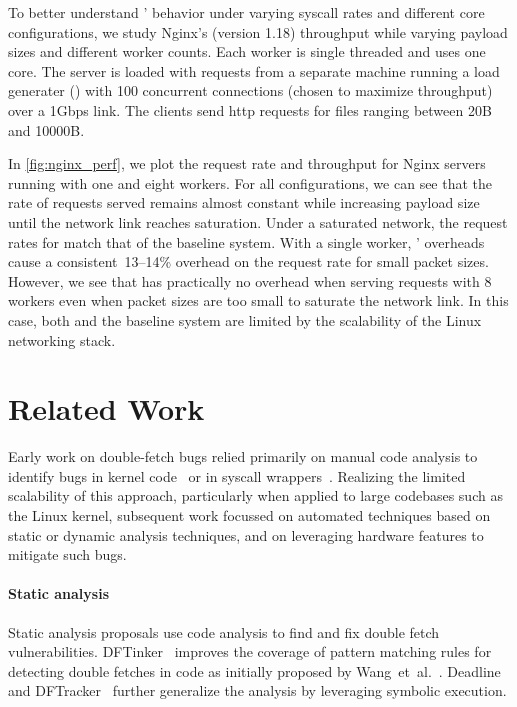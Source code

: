 To better understand \midas' behavior under varying syscall
rates and different core configurations, we study Nginx's (version 1.18)
throughput while varying payload sizes and different worker counts.
Each worker is single threaded and uses one core.
The server is loaded with requests from a separate machine running
a load generater () with 100 concurrent
connections (chosen to maximize throughput) over a 1Gbps link.
The clients send http requests for files ranging between 20B and
10000B.

In \autoref{fig:nginx_perf}, we plot the request rate and throughput
for Nginx servers running with one and eight workers.
For all configurations, we can see that the rate of requests served
remains almost constant while increasing payload size until the network
link reaches saturation.
Under a saturated network, the request rates for \midas match that
of the baseline system.
With a single worker, \midas' overheads cause a consistent~13--14\%
overhead on the request rate for small packet sizes.
However, we see that \midas has practically no overhead when serving
requests with 8 workers even when packet sizes are too small to
saturate the network link.
In this case, both \midas and the baseline system are limited by the
scalability of the Linux networking stack.

\section{Related Work}

Early work on double-fetch bugs relied primarily on manual
code analysis to identify bugs in kernel code~\cite{YangCSS12, twizsgrakky07ring0}
or in syscall wrappers~\cite{watson2007exploiting}.
Realizing the limited scalability of this approach, particularly
when applied to large codebases such as the Linux kernel, subsequent 
work focussed on automated techniques based on static or dynamic 
analysis techniques, and on leveraging hardware features to mitigate
such bugs.


\paragraph{Static analysis}
%
Static analysis proposals use code analysis to find and fix double fetch
vulnerabilities.
DFTinker~\cite{dftinker} improves the coverage of pattern matching rules
for detecting double fetches in code as initially proposed by Wang~et~al.~\cite{wang2017double}.
Deadline~\cite{deadline} and DFTracker~\cite{wang2019dftracker} further
generalize the analysis by leveraging symbolic execution.

